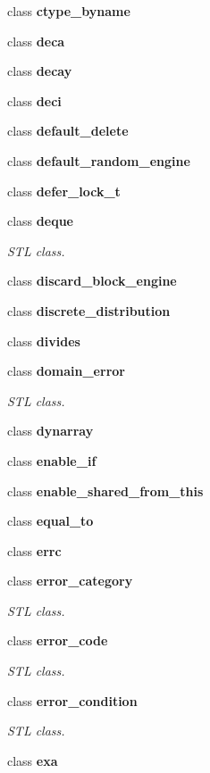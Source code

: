 \begin{DoxyCompactItemize}
class \textbf{ ctype\+\_\+byname}
\item 
class \textbf{ deca}
\item 
class \textbf{ decay}
\item 
class \textbf{ deci}
\item 
class \textbf{ default\+\_\+delete}
\item 
class \textbf{ default\+\_\+random\+\_\+engine}
\item 
class \textbf{ defer\+\_\+lock\+\_\+t}
\item 
class \textbf{ deque}
\begin{DoxyCompactList}\small\item\em S\+TL class. \end{DoxyCompactList}\item 
class \textbf{ discard\+\_\+block\+\_\+engine}
\item 
class \textbf{ discrete\+\_\+distribution}
\item 
class \textbf{ divides}
\item 
class \textbf{ domain\+\_\+error}
\begin{DoxyCompactList}\small\item\em S\+TL class. \end{DoxyCompactList}\item 
class \textbf{ dynarray}
\item 
class \textbf{ enable\+\_\+if}
\item 
class \textbf{ enable\+\_\+shared\+\_\+from\+\_\+this}
\item 
class \textbf{ equal\+\_\+to}
\item 
class \textbf{ errc}
\item 
class \textbf{ error\+\_\+category}
\begin{DoxyCompactList}\small\item\em S\+TL class. \end{DoxyCompactList}\item 
class \textbf{ error\+\_\+code}
\begin{DoxyCompactList}\small\item\em S\+TL class. \end{DoxyCompactList}\item 
class \textbf{ error\+\_\+condition}
\begin{DoxyCompactList}\small\item\em S\+TL class. \end{DoxyCompactList}\item 
class \textbf{ exa}
\item 

\end{DoxyCompactItemize}
